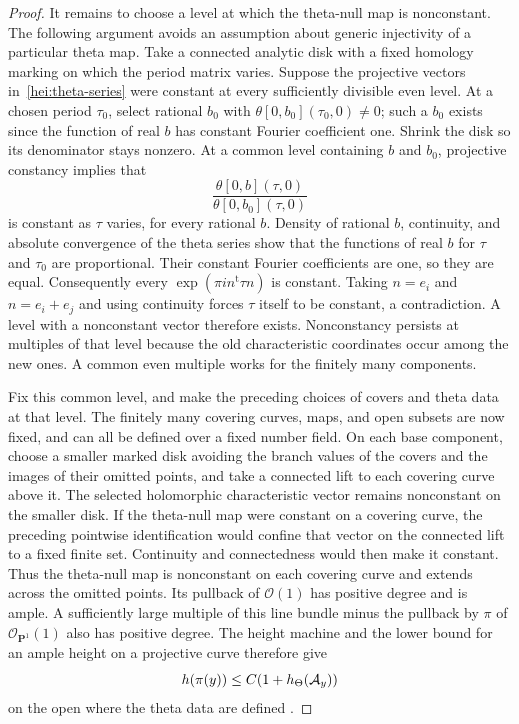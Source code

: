 \begin{proof}
It remains to choose a level at which the theta-null map is
nonconstant.  The following argument avoids an assumption about
generic injectivity of a particular theta map.  Take a connected
analytic disk with a fixed homology marking on which the period matrix
varies.  Suppose the projective vectors
in~\eqref{hei:theta-series} were constant at every sufficiently
divisible even level.  At a chosen period $\tau_0$, select rational
$b_0$ with $\theta[0,b_0](\tau_0,0)\ne0$; such a $b_0$ exists since
the function of real $b$ has constant Fourier coefficient one.
Shrink the disk so its denominator stays nonzero.  At a common level
containing $b$ and $b_0$, projective constancy implies that
\[
          \frac{\theta[0,b](\tau,0)}{\theta[0,b_0](\tau,0)}
\]
is constant as $\tau$ varies, for every rational $b$.  Density of
rational $b$, continuity, and absolute convergence of the theta
series show that the functions of real $b$ for $\tau$ and $\tau_0$
are proportional.  Their constant Fourier coefficients are one, so
they are equal.  Consequently every
$\exp(\pi i n^{\mathrm t}\tau n)$ is constant.  Taking $n=e_i$ and
$n=e_i+e_j$ and using continuity forces $\tau$ itself to be constant,
a contradiction.  A level with a nonconstant vector therefore exists.
Nonconstancy persists at multiples of that level because the old
characteristic coordinates occur among the new ones.  A common even
multiple works for the finitely many components.

Fix this common level, and make the preceding choices of covers and
theta data at that level.  The finitely many covering curves, maps,
and open subsets are now fixed, and can all be defined over a fixed
number field.  On each base component, choose a smaller marked disk
avoiding the branch values of the covers and the images of their
omitted points, and take a connected lift to each covering curve above
it.  The selected holomorphic characteristic vector remains
nonconstant on the smaller disk.  If the theta-null map were constant
on a covering curve, the preceding pointwise identification would
confine that vector on the connected lift to a fixed finite set.
Continuity and connectedness would then make it constant.  Thus the
theta-null map is nonconstant on each covering curve and extends
across the omitted points.  Its pullback of $\mathcal O(1)$
has positive degree and is ample.  A sufficiently large multiple
of this line bundle minus the pullback by $\pi$ of
$\mathcal O_{\mathbf P^1}(1)$ also has positive degree.  The height
machine and the lower bound for an ample height on a projective curve
therefore give
\begin{equation}\label{hei:theta-base}
                  h(\pi(y))\le C(1+h_\Theta(\mathcal A_y))
\end{equation}
on the open where the theta data are defined
\cite{BombieriGubler2006}.


\end{proof}
